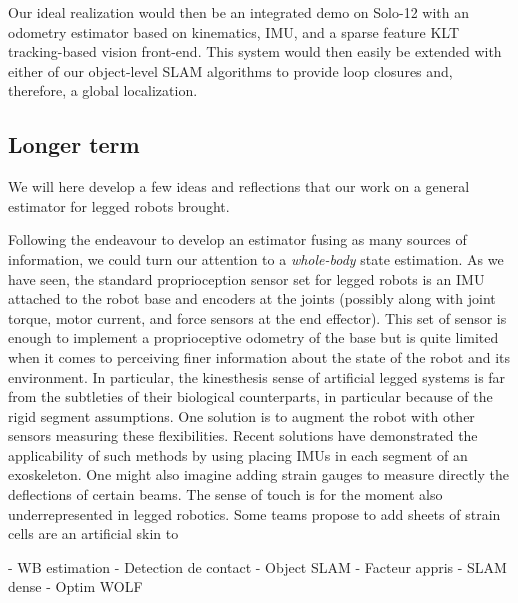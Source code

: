 Our ideal realization would then be an integrated demo on Solo-12 with an odometry estimator based on kinematics, IMU, and a sparse feature KLT tracking-based 
vision front-end. This system would then easily be extended with either of our object-level SLAM algorithms to provide loop closures and, therefore, a global localization.



\subsection{Longer term}

We will here develop a few ideas and reflections that our work on a general estimator for legged robots brought.

Following the endeavour to develop an estimator fusing as many sources of information, we could turn our attention to a 
\textit{whole-body} state estimation. As we have seen, the standard proprioception sensor set for legged robots is an IMU attached to the robot base
and encoders at the joints (possibly along with joint torque, motor current, and force sensors at the end effector). This set of sensor
is enough to implement a proprioceptive odometry of the base but is quite limited when it comes to perceiving finer information about the state of the robot
and its environment. In particular, the kinesthesis sense of artificial legged systems is far from the subtleties of their biological counterparts, in particular
because of the rigid segment assumptions. One solution is to augment the robot with other sensors measuring these flexibilities. Recent solutions have demonstrated
the applicability of such methods by using placing IMUs in each segment of an exoskeleton. One might also imagine adding strain gauges to measure directly 
the deflections of certain beams.  The sense of touch is for the moment also underrepresented in legged robotics. Some teams propose to add sheets
of strain cells are an artificial skin to 

- WB estimation
- Detection de contact
- Object SLAM
- Facteur appris 
- SLAM dense
- Optim WOLF

